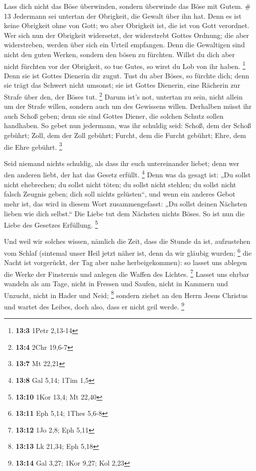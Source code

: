  Lass dich nicht das Böse überwinden, sondern überwinde das
Böse mit Gutem. \# 13  Jedermann sei untertan der Obrigkeit,
die Gewalt über ihn hat. Denn es ist keine Obrigkeit ohne von Gott; wo
aber Obrigkeit ist, die ist von Gott verordnet.  Wer sich
nun der Obrigkeit widersetzt, der widerstrebt Gottes Ordnung; die aber
widerstreben, werden über sich ein Urteil empfangen.  Denn
die Gewaltigen sind nicht den guten Werken, sondern den bösen zu
fürchten. Willst du dich aber nicht fürchten vor der Obrigkeit, so tue
Gutes, so wirst du Lob von ihr haben. \footnote{\textbf{13:3} 1Petr
  2,13-14}  Denn sie ist Gottes Dienerin dir zugut. Tust du
aber Böses, so fürchte dich; denn sie trägt das Schwert nicht umsonst;
sie ist Gottes Dienerin, eine Rächerin zur Strafe über den, der Böses
tut. \footnote{\textbf{13:4} 2Chr 19,6-7}  Darum ist's not,
untertan zu sein, nicht allein um der Strafe willen, sondern auch um des
Gewissens willen.  Derhalben müsst ihr auch Schoß geben;
denn sie sind Gottes Diener, die solchen Schutz sollen handhaben.
 So gebet nun jedermann, was ihr schuldig seid: Schoß, dem
der Schoß gebührt; Zoll, dem der Zoll gebührt; Furcht, dem die Furcht
gebührt; Ehre, dem die Ehre gebührt. \footnote{\textbf{13:7} Mt 22,21}

 Seid niemand nichts schuldig, als dass ihr euch
untereinander liebet; denn wer den anderen liebt, der hat das Gesetz
erfüllt. \footnote{\textbf{13:8} Gal 5,14; 1Tim 1,5}  Denn
was da gesagt ist: „Du sollst nicht ehebrechen; du sollst nicht töten;
du sollst nicht stehlen; du sollst nicht falsch Zeugnis geben; dich soll
nichts gelüsten``, und wenn ein anderes Gebot mehr ist, das wird in
diesem Wort zusammengefasst: „Du sollst deinen Nächsten lieben wie dich
selbst.``  Die Liebe tut dem Nächsten nichts Böses. So ist
nun die Liebe des Gesetzes Erfüllung. \footnote{\textbf{13:10} 1Kor
  13,4; Mt 22,40}

 Und weil wir solches wissen, nämlich die Zeit, dass die
Stunde da ist, aufzustehen vom Schlaf (sintemal unser Heil jetzt näher
ist, denn da wir gläubig wurden; \footnote{\textbf{13:11} Eph 5,14;
  1Thes 5,6-8}  die Nacht ist vorgerückt, der Tag aber nahe
herbeigekommen): so lasset uns ablegen die Werke der Finsternis und
anlegen die Waffen des Lichtes. \footnote{\textbf{13:12} 1Jo 2,8; Eph
  5,11}  Lasset uns ehrbar wandeln als am Tage, nicht in
Fressen und Saufen, nicht in Kammern und Unzucht, nicht in Hader und
Neid; \footnote{\textbf{13:13} Lk 21,34; Eph 5,18}  sondern
ziehet an den Herrn Jesus Christus und wartet des Leibes, doch also,
dass er nicht geil werde. \footnote{\textbf{13:14} Gal 3,27; 1Kor 9,27;
  Kol 2,23}

